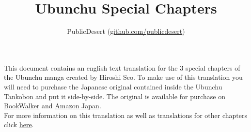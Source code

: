 \documentclass[12pt]{article}
\title{Ubunchu Special Chapters}
\author{PublicDesert (\href{https://github.com/publicdesert}{github.com/publicdesert})}
\date{}
\begin{document}
\maketitle
\thispagestyle{empty}

This document contains an english text translation for the 3 special chapters of the Ubunchu manga created by Hiroshi Seo. To make use of this translation you will need to purchase the Japanese original contained inside the Ubunchu Tankōbon and put it side-by-side. The original is available for purchase on \href{https://bookwalker.jp/decf255320-459b-4d7c-92d3-8d5281052c28/}{BookWalker} and \href{https://www.amazon.co.jp/-/en/dp/B00N4M5S8K}{Amazon Japan}.\\

For more information on this translation as well as translations for other chapters click \href{https://github.com/publicdesert/ubunchu_english}{here}.
\end{document}
